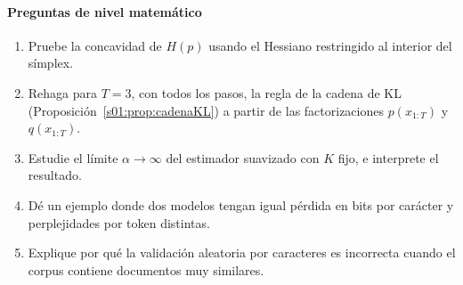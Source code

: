 \paragraph{Preguntas de nivel matemático}
\begin{enumerate}
\item Pruebe la concavidad de $H(p)$ usando el Hessiano restringido al
interior del símplex.
\item Rehaga para $T=3$, con todos los pasos, la regla de la cadena de KL (Proposición~\ref{s01:prop:cadenaKL}) a partir de las factorizaciones
$p(x_{1:T})$ y $q(x_{1:T})$.
\item Estudie el límite $\alpha\to\infty$ del estimador suavizado
con $K$ fijo, e interprete el resultado.
\item Dé un ejemplo donde dos modelos tengan igual pérdida en bits por
carácter y perplejidades por token distintas.
\item Explique por qué la validación aleatoria por caracteres es
incorrecta cuando el corpus contiene documentos muy similares.
\end{enumerate}

